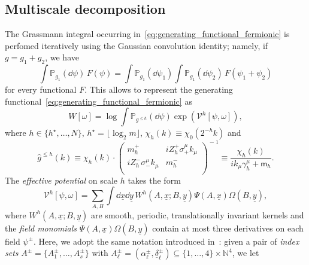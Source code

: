 \documentclass[a4paper, 11pt]{article}
\newcommand{\N}{\mathbb{N}}
\newcommand{\dgauss}[2]{\mathbb{P}_{#1}(\dd #2)}			%
\newcommand{\sing}[2]{{#1}^{#2}}							%
\newcommand{\src}{\omega}									%
\newcommand{\Src}{\Omega}
\theoremstyle{thm}
\begin{document}
\subsection{Multiscale decomposition}
\label{subsec:rg_step_and_localization}
The Grassmann integral occurring in~\eqref{eq:generating_functional_fermionic}
is perfomed iteratively using the Gaussian convolution identity; namely, if $g = g_1 + g_2$, we have
\begin{equation}
\label{eq:measure_additivity}
\int \dgauss{g_1}{\psi} \, F(\psi)=\int \dgauss{g_1}{\psi_1} \int \dgauss{g_1}{\psi_2} \, F(\psi_1+\psi_2)
\end{equation}
for every functional $F$. This allows to represent
the generating functional~\eqref{eq:generating_functional_fermionic} as
\begin{equation}
\label{eq:generating_functional_on_scale_h}
W[\src] = \log \int \dgauss{\sing{g}{\le h}}{\psi} \exp(\mathscr{V}^{h}[\psi, \src]),
\end{equation}
where $h \in \lbrace h^\star, \dots, N \rbrace$, $h^\star = \lfloor \log_2 m \rfloor$, $\chi_h(k) \equiv \chi_0(2^{-h} k)$ and
\begin{equation}
\label{eq:renormalized_propagator}
\sing{\hat{g}}{\le h}(k) \equiv 
\chi_h(k) \cdot
\begin{pmatrix}
m_h^+						&	i Z_h^+ \sigma^\mu_+ k_\mu \\
i Z_h^- \sigma^\mu_- k_\mu	&	m_h^- \\
\end{pmatrix}^{\!-1}
\equiv \frac{\chi_h(k)}{i k_\mu \gamma^\mu_h + \mathsf{m}_h}.
\end{equation}
The \emph{effective potential} on scale $h$ takes the form
\begin{equation}
\label{eq:veff_kernels}
\sing{\mathscr{V}}{h}[\psi, \src] = \sum_{A, B} \int \dd{\underline{x}} \dd{\underline{y}} \, \sing{W}{h}(A, \underline{x}; B, \underline{y}) \Psi(A, \underline{x}) \Src(B, \underline{y}),
\end{equation}
where $\sing{W}{h}(A, \underline{x}; B, \underline{y})$ are smooth, periodic, translationally invariant kernels and the \emph{field monomials} $\Psi(A, \underline{x}) \Src(B, \underline{y})$ contain at most three derivatives on each field $\psi^\pm$. Here, we adopt the same notation introduced in~\cite[Equation (4.2)]{Giuliani_Mastropietro_Rychkov_2021}: given a pair of \emph{index sets} $A^\pm = \lbrace A_1^\pm, \dots, A_s^\pm \rbrace$ with $A^\pm_\ell = (\alpha_\ell^\pm, \underline{\delta}_\ell^\pm) \subseteq \lbrace 1, \dots, 4 \rbrace \times \N^4$, we let
\end{document}

